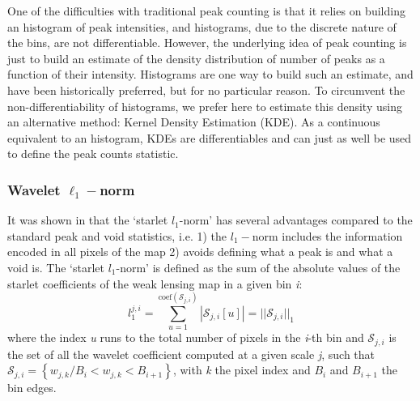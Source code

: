 \documentclass[twocolumn,twocolappendix]{aastex63}
\begin{document}
One of the difficulties with traditional peak counting is that it relies on building
an histogram of peak intensities, and histograms, due to the discrete nature of the bins, are not differentiable. However, the underlying idea of peak counting is just to build an estimate of the density distribution of number of peaks as a function of their intensity. Histograms are one way to build such an estimate, and have been historically preferred, but for no particular reason. To circumvent the non-differentiability of histograms, we prefer here to estimate this density using an alternative method: Kernel Density Estimation (KDE). As a continuous equivalent to an histogram, KDEs are differentiables and can just as well be used to define the peak counts statistic.

\subsubsection{Wavelet $\ell_1-$norm}
It was shown in \cite{ajani2021starlet} that the ‘starlet $l_1$-norm’ has  several advantages compared to the standard peak and void statistics, i.e. 1) the $l_1-$norm includes the information encoded in all pixels of the map 2) avoids defining  what a peak is and what a void is. 
The ‘starlet $l_1$-norm’ is defined as the sum of the absolute values of the starlet coefficients of the weak lensing map in a given bin \textit{i}:
\begin{equation}
    l_1^{j,i}=\sum_{u=1}^{\text{coef}(\mathcal{S}_{j,i})} 
    |\mathcal{S}_{j,i}[u]|=
    ||\mathcal{S}_{j,i}||_1
\end{equation}
where the index \textit{u} runs to the total number of pixels in the \textit{i}-th bin and $\mathcal{S}_{j,i}$ is the set of all the wavelet coefficient computed at a given scale \textit{j}, such that $\mathcal{S}_{j,i}=
\left \{  w_{j,k}/B_i<w_{j,k}<B_{i+1}\right \}$, with \textit{k} the pixel index and $B_i$ and $B_{i+1}$ the bin edges. 
\end{document}
